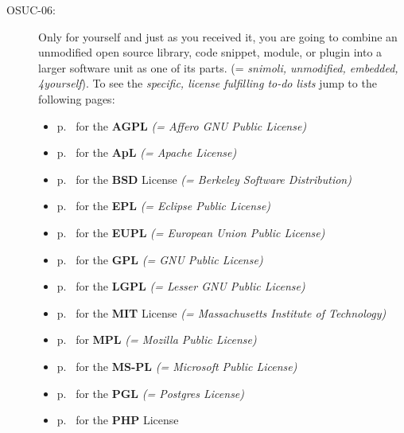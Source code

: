 \begin{description}
\item[OSUC-06:]\label{OSUC-06-DEF} Only for yourself and just as you received
it, you are going to combine an unmodified open source library, code snippet,
module, or plugin into a larger software unit as one of its parts. (=
\textit{snimoli, unmodified, embedded, 4yourself}).
To see the \textit{specific, license fulfilling to-do lists} jump to the
following pages:
   \begin{itemize}
    \item p.\ \pageref{OSUC-06-AGPL} for the \textbf{AGPL}
      \textit{(= Affero GNU Public License)} 
    \item p.\ \pageref{OSUC-06-Apache20} for the \textbf{ApL}
      \textit{(= Apache License)}
    \item p.\ \pageref{OSUC-06-BSD} for the \textbf{BSD} License
      \textit{(= Berkeley Software Distribution)}
    \item p.\ \pageref{OSUC-06-EPL} for the \textbf{EPL}
      \textit{(= Eclipse Public License)}     
    \item p.\ \pageref{OSUC-06-EUPL} for the \textbf{EUPL}
      \textit{(= European Union Public License)} 
    \item p.\ \pageref{OSUC-06-GPL} for the \textbf{GPL}
       \textit{(= GNU Public License)} 
    \item p.\ \pageref{OSUC-06-LGPL} for the \textbf{LGPL}
      \textit{(= Lesser GNU Public License)}           
    \item p.\ \pageref{OSUC-06-MIT} for the \textbf{MIT} License
       \textit{(= Massachusetts Institute of Technology)} 
    \item p.\ \pageref{OSUC-06-MPL} for \textbf{MPL}
      \textit{(= Mozilla Public License)}     
    \item p.\ \pageref{OSUC-06-MS-PL} for the \textbf{MS-PL}
      \textit{(= Microsoft Public License)} 
    \item p.\ \pageref{OSUC-06-PGL} for the \textbf{PGL}
      \textit{(= Postgres License)} 
    \item p.\ \pageref{OSUC-06-PHP} for the \textbf{PHP} License 
  \end{itemize}


\end{description}
